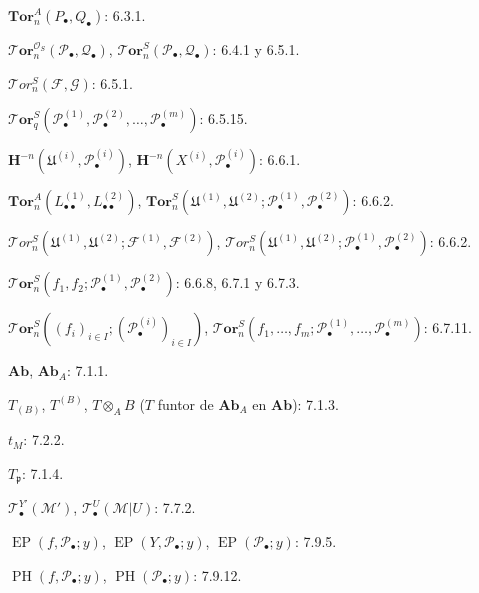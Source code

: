 \documentclass[10pt,oneside,openany]{book}
\theoremstyle{egaenv}\newtheorem*{env}{---}
\theoremstyle{egastatement}
\theoremstyle{egadescription}
\begin{document}
\begin{flushleft}
$\mathbf{Tor}_n^A(P_\bullet,Q_\bullet)$: 6.3.1.

\medskip
$\boldsymbol{\mathscr{T}\!or}_n^{\mathscr O_S}(\mathscr P_\bullet,\mathscr Q_\bullet)$,
$\boldsymbol{\mathscr{T}\!or}_n^S(\mathscr P_\bullet,\mathscr Q_\bullet)$: 6.4.1 y 6.5.1.

\medskip
$\mathscr{T}\!or_n^S(\mathscr F,\mathscr G)$: 6.5.1.

\medskip
$\boldsymbol{\mathscr{T}\!or}_q^S(\mathscr P_\bullet^{(1)},\mathscr P_\bullet^{(2)},\ldots,
\mathscr P_\bullet^{(m)})$: 6.5.15.

\medskip
$\mathbf H^{-n}(\mathfrak U^{(i)},\mathscr P_\bullet^{(i)})$,
$\mathbf H^{-n}(X^{(i)},\mathscr P_\bullet^{(i)})$: 6.6.1.

\medskip
$\mathbf{Tor}_n^A(L_{\bullet\bullet}^{(1)},L_{\bullet\bullet}^{(2)})$,
$\mathbf{Tor}_n^S(\mathfrak U^{(1)},\mathfrak U^{(2)};
\mathscr P_\bullet^{(1)},\mathscr P_\bullet^{(2)})$: 6.6.2.

\medskip
$\mathscr{T}\!or_n^S(\mathfrak U^{(1)},\mathfrak U^{(2)};
\mathscr F^{(1)},\mathscr F^{(2)})$,
$\mathscr{T}\!or_n^S(\mathfrak U^{(1)},\mathfrak U^{(2)};
\mathscr P_\bullet^{(1)},\mathscr P_\bullet^{(2)})$: 6.6.2.

\medskip
$\boldsymbol{\mathscr{T}\!or}_n^S(f_1,f_2;\mathscr P_\bullet^{(1)},
\mathscr P_\bullet^{(2)})$: 6.6.8, 6.7.1 y 6.7.3.

\medskip
$\boldsymbol{\mathscr{T}\!or}_n^S((f_i)_{i\in I};(\mathscr P_\bullet^{(i)})_{i\in I})$,
$\boldsymbol{\mathscr{T}\!or}_n^S(f_1,\ldots,f_m;\mathscr P_\bullet^{(1)},\ldots,
\mathscr P_\bullet^{(m)})$: 6.7.11.

\medskip
$\boldsymbol{Ab}$, $\boldsymbol{Ab}_A$: 7.1.1.

\medskip
$T_{(B)}$, $T^{(B)}$, $T\otimes_A B$
($T$ funtor de $\boldsymbol{Ab}_A$ en $\boldsymbol{Ab}$): 7.1.3.

\medskip
$t_M$: 7.2.2.

\medskip
$T_{\mathfrak p}$: 7.1.4.

\medskip
$\mathscr T_\bullet^{Y'}(\mathscr M')$,
$\mathscr T_\bullet^U(\mathscr M|U)$: 7.7.2.

\medskip
$\operatorname{EP}(f,\mathscr P_\bullet;y)$,
$\operatorname{EP}(Y,\mathscr P_\bullet;y)$,
$\operatorname{EP}(\mathscr P_\bullet;y)$: 7.9.5.

\medskip
$\operatorname{PH}(f,\mathscr P_\bullet;y)$,
$\operatorname{PH}(\mathscr P_\bullet;y)$: 7.9.12.
\end{flushleft}
\end{document}
